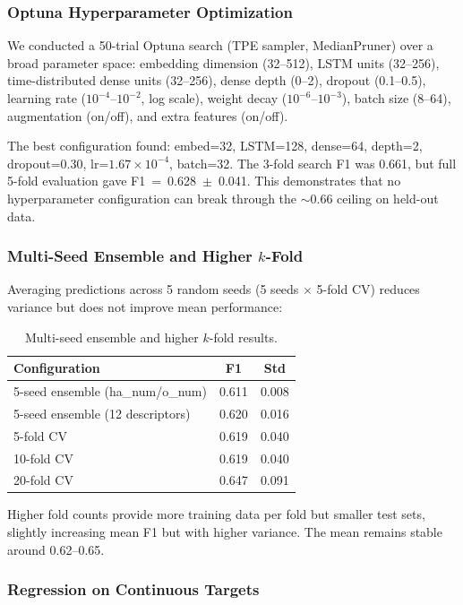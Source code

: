 \documentclass[11pt,a4paper]{article}
\begin{document}
\subsubsection{Optuna Hyperparameter Optimization}

We conducted a 50-trial Optuna search (TPE sampler, MedianPruner) over a broad parameter space: embedding dimension (32--512), LSTM units (32--256), time-distributed dense units (32--256), dense depth (0--2), dropout (0.1--0.5), learning rate ($10^{-4}$--$10^{-2}$, log scale), weight decay ($10^{-6}$--$10^{-3}$), batch size (8--64), augmentation (on/off), and extra features (on/off).

The best configuration found: embed=32, LSTM=128, dense=64, depth=2, dropout=0.30, lr=$1.67 \times 10^{-4}$, batch=32. The 3-fold search F1 was 0.661, but full 5-fold evaluation gave F1~=~0.628~$\pm$~0.041. This demonstrates that no hyperparameter configuration can break through the $\sim$0.66 ceiling on held-out data.

\subsubsection{Multi-Seed Ensemble and Higher $k$-Fold}

Averaging predictions across 5 random seeds (5 seeds $\times$ 5-fold CV) reduces variance but does not improve mean performance:

\begin{table}[H]
\centering
\caption{Multi-seed ensemble and higher $k$-fold results.}
\label{tab:ensemble_kfold}
\begin{tabular}{lcc}
\toprule
Configuration & F1 & Std \\
\midrule
5-seed ensemble (ha\_num/o\_num) & 0.611 & 0.008 \\
5-seed ensemble (12 descriptors) & 0.620 & 0.016 \\
\midrule
5-fold CV & 0.619 & 0.040 \\
10-fold CV & 0.619 & 0.040 \\
20-fold CV & 0.647 & 0.091 \\
\bottomrule
\end{tabular}
\end{table}

Higher fold counts provide more training data per fold but smaller test sets, slightly increasing mean F1 but with higher variance. The mean remains stable around 0.62--0.65.

\subsubsection{Regression on Continuous Targets}
\end{document}
